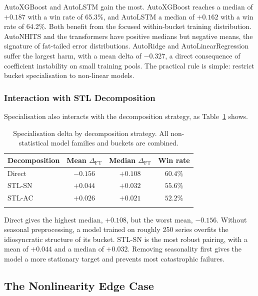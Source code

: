 \documentclass[pdflatex,sn-mathphys-num]{sn-jnl}
\theoremstyle{thmstyleone}
\theoremstyle{thmstyletwo}
\theoremstyle{thmstylethree}
\begin{document}
AutoXGBoost and AutoLSTM gain the most. AutoXGBoost reaches a median of
$+0.187$ with a win rate of 65.3\%, and AutoLSTM a median of $+0.162$ with a
win rate of 64.2\%. Both benefit from the focused within-bucket training
distribution. AutoNHITS and the transformers have positive medians but
negative means, the signature of fat-tailed error distributions. AutoRidge and
AutoLinearRegression suffer the largest harm, with a mean delta of $-0.327$, a
direct consequence of coefficient instability on small training pools. The
practical rule is simple: restrict bucket specialisation to non-linear models.

\subsubsection{Interaction with STL Decomposition}\label{sec:ft_stl_interact}

Specialisation also interacts with the decomposition strategy, as
Table~\ref{tab:ft_decomp} shows.

\begin{table}[ht]
\caption{Specialisation delta by decomposition strategy. All non-statistical
model families and buckets are combined.}\label{tab:ft_decomp}
\begin{tabular}{lccc}
\toprule
Decomposition & Mean $\Delta_{\mathrm{FT}}$ & Median $\Delta_{\mathrm{FT}}$ & Win rate \\
\midrule
Direct   & $-0.156$ & $+0.108$ & $60.4\%$ \\
STL-SN   & $+0.044$ & $+0.032$ & $55.6\%$ \\
STL-AC   & $+0.026$ & $+0.021$ & $52.2\%$ \\
\botrule
\end{tabular}
\end{table}

Direct gives the highest median, $+0.108$, but the worst mean, $-0.156$.
Without seasonal preprocessing, a model trained on roughly 250 series overfits
the idiosyncratic structure of its bucket. STL-SN is the most robust pairing,
with a mean of $+0.044$ and a median of $+0.032$. Removing seasonality first
gives the model a more stationary target and prevents most catastrophic
failures.

\subsection{The Nonlinearity Edge Case}\label{sec:nonlin_edge}
\end{document}
